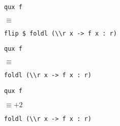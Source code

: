\documentclass{gift}
\begin{document}
\begin{giftMO}
\item \begin{giftFragmento}
\end  {giftFragmento}

\verb!qux f!
\begin{giftFragmento}
\end  {giftFragmento}

$\equiv$
\begin{giftFragmento}
\end  {giftFragmento}

\verb!flip $ foldl (\\r x -> f x : r)!
\begin{giftFragmento}
\end  {giftFragmento}


\item \begin{giftFragmento}
\end  {giftFragmento}

\verb!qux f!
\begin{giftFragmento}
\end  {giftFragmento}

$\equiv$
\begin{giftFragmento}
\end  {giftFragmento}

\verb!foldl (\\r x -> f x : r)!
\begin{giftFragmento}
\end  {giftFragmento}


\item \begin{giftFragmento}
\end  {giftFragmento}

\verb!qux f!
\begin{giftFragmento}
\end  {giftFragmento}

$\equiv + 2$
\begin{giftFragmento}
\end  {giftFragmento}

\verb!foldl (\\r x -> f x : r)!
\begin{giftFragmento}
\end  {giftFragmento}


\item \begin{giftFragmento}
\end  {giftFragmento}


\end{giftMO}
\end{document}
